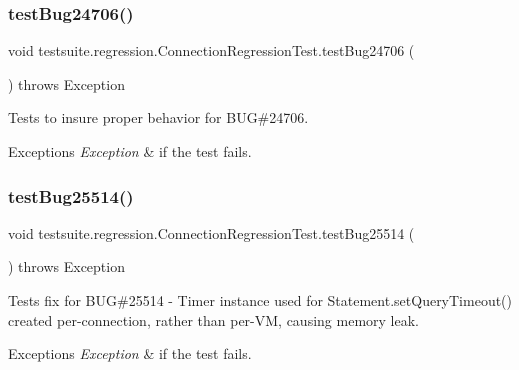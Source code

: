 \subsubsection{\texorpdfstring{test\+Bug24706()}{testBug24706()}}
{\footnotesize\ttfamily void testsuite.\+regression.\+Connection\+Regression\+Test.\+test\+Bug24706 (\begin{DoxyParamCaption}{ }\end{DoxyParamCaption}) throws Exception}

Tests to insure proper behavior for B\+UG\#24706.


\begin{DoxyExceptions}{Exceptions}
{\em Exception} & if the test fails. \\
\hline
\end{DoxyExceptions}
\mbox{\label{classtestsuite_1_1regression_1_1_connection_regression_test_adbc6d893aaac816110cf40953338eead}} 
\subsubsection{\texorpdfstring{test\+Bug25514()}{testBug25514()}}
{\footnotesize\ttfamily void testsuite.\+regression.\+Connection\+Regression\+Test.\+test\+Bug25514 (\begin{DoxyParamCaption}{ }\end{DoxyParamCaption}) throws Exception}

Tests fix for B\+UG\#25514 -\/ Timer instance used for Statement.\+set\+Query\+Timeout() created per-\/connection, rather than per-\/\+VM, causing memory leak.


\begin{DoxyExceptions}{Exceptions}
{\em Exception} & if the test fails. \\
\hline
\end{DoxyExceptions}
\mbox{\label{classtestsuite_1_1regression_1_1_connection_regression_test_a98a44b0432aebd94026747e6fce76282}} 
